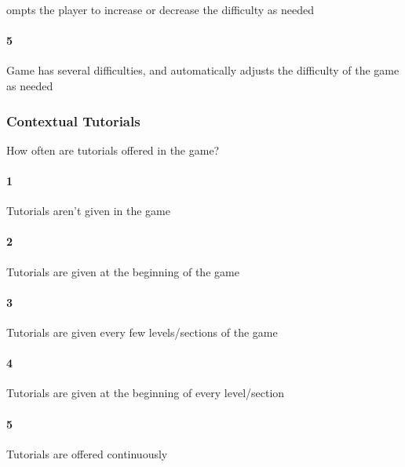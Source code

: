 ompts the player to increase or decrease the difficulty as needed\paragraph{5}Game has several difficulties, and automatically adjusts the difficulty of the game as needed\subsubsection{Contextual Tutorials}How often are tutorials offered in the game?\paragraph{1}Tutorials aren't given in the game\paragraph{2}Tutorials are given at the beginning of the game\paragraph{3}Tutorials are given every few levels/sections of the game\paragraph{4}Tutorials are given at the beginning of every level/section\paragraph{5}Tutorials are offered continuously